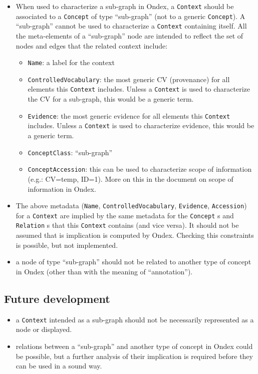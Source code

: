 \documentclass[a4paper,10pt]{article}
\newcommand{\term}[1]{\texttt{#1}\xspace}
\newcommand{\co}{\term{Concept}}
\newcommand{\cxt}{\term{Context}}
\newcommand{\re}{\term{Relation}}
\begin{document}
\begin{itemize}
\item When used to characterize a sub-graph in Ondex, a \cxt should be associated to a \co of type ``sub-graph'' (not to a generic \co).  A ``sub-graph'' cannot be used to characterize a \cxt containing itself. All the meta-elements of a ``sub-graph'' node are intended to reflect the set of nodes and edges that the related context include:
\begin{itemize}
\item \term{Name}: a label for the context
\item \term{ControlledVocabulary}: the most generic CV (provenance) for all elements this \cxt includes. Unless a \cxt is used to characterize the CV for a sub-graph, this would be a generic term.
\item \term{Evidence}: the most generic evidence for all elements this \cxt includes. Unless a \cxt is used to characterize evidence, this would be a generic term.
\item \term{ConceptClass}: ``sub-graph''
\item \term{ConceptAccession}: this can be used to characterize scope of information (e.g.: CV=temp, ID=1). More on this in the document on scope of information in Ondex.
\end{itemize}
\item The above metadata (\term{Name}, \term{ControlledVocabulary}, \term{Evidence}, \term{Accession}) for a  \cxt are implied by the same metadata for the \co s and \re s that this \cxt contains (and vice versa). It should not be assumed that is implication is computed by Ondex. Checking this constraints is possible, but not implemented.
\item a node of type ``sub-graph'' should not be related to another type of concept in Ondex (other than with the meaning of ``annotation'').


\end{itemize}



\subsection{Future development}
\begin{itemize}
\item a \cxt intended as a sub-graph should not be necessarily represented as a node or displayed.
\item relations between a ``sub-graph'' and another type of concept in Ondex could be possible, but a further analysis of their implication is required before they can be used in a sound way.
\end{itemize}
\end{document}
